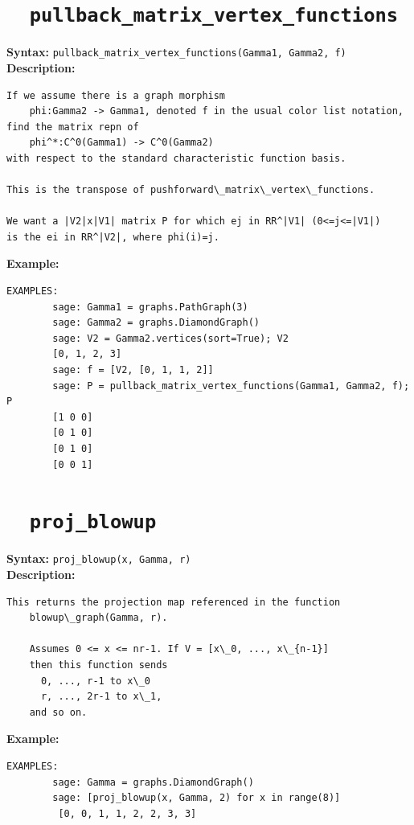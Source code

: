 \documentclass{article}
\begin{document}
\section{\tt \ \ pullback\_matrix\_vertex\_functions}

\textbf{Syntax:} \verb}pullback_matrix_vertex_functions(Gamma1, Gamma2, f)}\\

\textbf{Description:}
\begin{verbatim}
If we assume there is a graph morphism
    phi:Gamma2 -> Gamma1, denoted f in the usual color list notation,
find the matrix repn of
    phi^*:C^0(Gamma1) -> C^0(Gamma2)
with respect to the standard characteristic function basis.

This is the transpose of pushforward\_matrix\_vertex\_functions.

We want a |V2|x|V1| matrix P for which ej in RR^|V1| (0<=j<=|V1|)
is the ei in RR^|V2|, where phi(i)=j.
\end{verbatim}

\textbf{Example:}
\begin{verbatim}
EXAMPLES:
        sage: Gamma1 = graphs.PathGraph(3)
        sage: Gamma2 = graphs.DiamondGraph()
        sage: V2 = Gamma2.vertices(sort=True); V2
        [0, 1, 2, 3]
        sage: f = [V2, [0, 1, 1, 2]]
        sage: P = pullback_matrix_vertex_functions(Gamma1, Gamma2, f); P
        [1 0 0]
        [0 1 0]
        [0 1 0]
        [0 0 1]
\end{verbatim}

\section{\tt \ \ proj\_blowup}

\textbf{Syntax:} \verb}proj_blowup(x, Gamma, r)}\\

\textbf{Description:}
\begin{verbatim}
This returns the projection map referenced in the function
    blowup\_graph(Gamma, r).

    Assumes 0 <= x <= nr-1. If V = [x\_0, ..., x\_{n-1}]
    then this function sends 
      0, ..., r-1 to x\_0 
      r, ..., 2r-1 to x\_1, 
    and so on.
\end{verbatim}

\textbf{Example:}
\begin{verbatim}
EXAMPLES:
        sage: Gamma = graphs.DiamondGraph()
        sage: [proj_blowup(x, Gamma, 2) for x in range(8)]
         [0, 0, 1, 1, 2, 2, 3, 3]
\end{verbatim}
\end{document}
